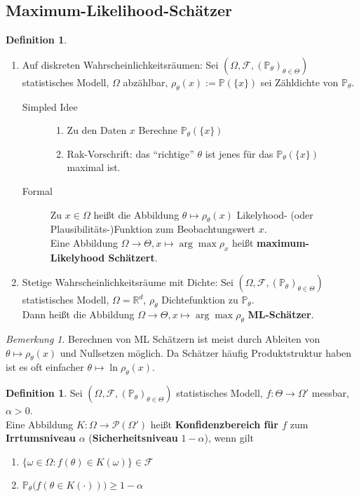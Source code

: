 \documentclass[10pt,a4paper]{article}
\newcommand{\R}{\ensuremath{\mathbb{R}}}
\newcommand{\al}{\ensuremath{\alpha}}
\newcommand{\Potset}{\mathscr P}
\newcommand{\Prb}{\mathbb P}
\newcommand{\scF}{\ensuremath{\mathscr{F}}}
\theoremstyle{plain}
\theoremstyle{definition}
\newtheorem{definition}[theorem]{Definition}
\theoremstyle{remark}
\newtheorem{bem}[theorem]{Bemerkung}
\begin{document}
	\subsection{Maximum-Likelihood-Schätzer}
	\begin{definition}
		\begin{enumerate}
			\item Auf diskreten Wahrscheinlichkeitsräumen: Sei $(\Omega,\scF,(\Prb_\theta)_{\theta\in\Theta})$ statistisches Modell, $\Omega$ abzählbar, $\rho_{\theta}(x):=\Prb(\{x\})$ sei Zähldichte von $\Prb_\theta$.
			\begin{description}
				\item[Simpled Idee] \begin{enumerate}
					\item Zu den Daten $x$ Berechne $\Prb_\theta(\{x\})$
					\item Rak-Vorschrift: das \enquote{richtige} $\theta$ ist jenes für das $\Prb_\theta(\{x\})$ maximal ist.
				\end{enumerate}
				\item[Formal] Zu $x\in\Omega$ heißt die Abbildung $\theta\mapsto\rho_\theta(x)$ Likelyhood- (oder Plausibilitäts-)Funktion zum Beobachtungswert $x$.\\
				Eine Abbildung $\Omega\to\Theta,x\mapsto\arg\max\rho_x$ heißt \textbf{maximum-Likelyhood Schätzert}.
			\end{description}
		\item Stetige Wahrscheinlichkeitsräume mit Dichte: Sei $(\Omega,\scF,(\Prb_\theta)_{\theta\in\Theta})$ statistisches Modell, $\Omega=\R^d$, $\rho_\theta$ Dichtefunktion zu $\Prb_\theta$.\\
		Dann heißt die Abbildung $\Omega\to\Theta, x\mapsto\arg\max\rho_\theta$ \textbf{ML-Schätzer}.
		\end{enumerate}
	\end{definition}

	\begin{bem}
		Berechnen von ML Schätzern ist meist durch Ableiten von $\theta\mapsto\rho_\theta(x)$ und Nullsetzen möglich. Da Schätzer häufig Produktstruktur haben ist es oft einfacher $\theta\mapsto\ln\rho_\theta(x)$.
	\end{bem}

	\begin{definition}
		Sei $(\Omega,\scF,(\Prb_\theta)_{\theta\in\Theta})$ statistisches Modell, $f:\Theta\to\Omega'$ messbar, $\al>0$.\\
		Eine Abbildung $K:\Omega\to\Potset(\Omega')$ heißt \textbf{Konfidenzbereich für $f$} zum \textbf{Irrtumsniveau} $\al$ (\textbf{Sicherheitsniveau} $1-\al$), wenn gilt
		\begin{enumerate}[label=(\roman*)]
			\item $\{\omega\in\Omega:f(\theta)\in K(\omega)\}\in\scF$
			\item $\Prb_\theta\big(f(\theta\in K(\cdot))\big)\geq 1-\al$
		\end{enumerate}
	\end{definition}
\end{document}
